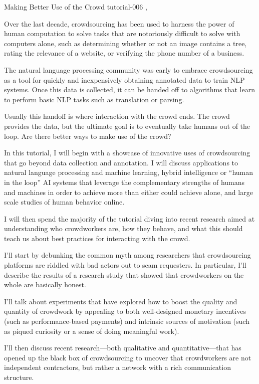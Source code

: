 \begin{tutorial}
  {Making Better Use of the Crowd}
  {tutorial-006}
  {\daydateyear, \tutorialafternoontime}
  {\TutLocF}
\end{tutorial}

Over the last decade, crowdsourcing has been used to harness the power of human computation to solve tasks that are notoriously difficult to solve with computers alone, such as determining whether or not an image contains a tree, rating the relevance of a website, or verifying the phone number of a business.

The natural language processing community was early to embrace crowdsourcing as a tool for quickly and inexpensively obtaining annotated data to train NLP systems. Once this data is collected, it can be handed off to algorithms that learn to perform basic NLP tasks such as translation or parsing.

Usually this handoff is where interaction with the crowd ends. The crowd provides the data, but the ultimate goal is to eventually take humans out of the loop. Are there better ways to make use of the crowd?

In this tutorial, I will begin with a showcase of innovative uses of crowdsourcing that go beyond data collection and annotation. I will discuss applications to natural language processing and machine learning, hybrid intelligence or “human in the loop” AI systems that leverage the complementary strengths of humans and machines in order to achieve more than either could achieve alone, and large scale studies of human behavior online.

I will then spend the majority of the tutorial diving into recent research aimed at understanding who crowdworkers are, how they behave, and what this should teach us about best practices for interacting with the crowd.

I’ll start by debunking the common myth among researchers that crowdsourcing platforms are riddled with bad actors out to scam requesters. In particular, I’ll describe the results of a research study that showed that crowdworkers on the whole are basically honest.

I’ll talk about experiments that have explored how to boost the quality and quantity of crowdwork by appealing to both well-designed monetary incentives (such as performance-based payments) and intrinsic sources of motivation (such as piqued curiosity or a sense of doing meaningful work).

I’ll then discuss recent research—both qualitative and quantitative—that has opened up the black box of crowdsourcing to uncover that crowdworkers are not independent contractors, but rather a network with a rich communication structure.

